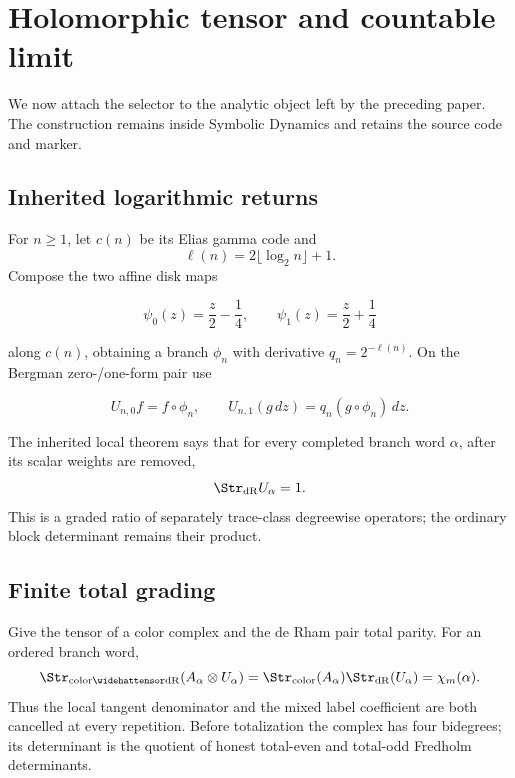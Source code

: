 \section{Holomorphic tensor and countable limit}
\label{sec:analytic}

We now attach the selector to the analytic object left by the preceding
paper.  The construction remains inside Symbolic Dynamics and retains the
source code and marker.

\subsection{Inherited logarithmic returns}

For \(n\ge1\), let \(c(n)\) be its Elias gamma code and
\begin{equation}
 \ell(n)=2\lfloor\log_2n\rfloor+1.
 \label{eq:gamma-length}
\end{equation}
Compose the two affine disk maps

\[
 \psi_0(z)=\frac z2-\frac14,
 \qquad
 \psi_1(z)=\frac z2+\frac14
\]

along \(c(n)\), obtaining a branch \(\phi_n\) with derivative
\(q_n=2^{-\ell(n)}\).  On the Bergman zero-/one-form pair use

\[
 U_{n,0}f=f\circ\phi_n,
 \qquad
 U_{n,1}(g\,dz)=q_n(g\circ\phi_n)\,dz.
\]

The inherited local theorem says that for every completed branch word
\(\alpha\), after its scalar weights are removed,
\begin{equation}
 \Str_{\mathrm{dR}}U_\alpha=1.
 \label{eq:inherited-derham}
\end{equation}
This is a graded ratio of separately trace-class degreewise operators; the
ordinary block determinant remains their product.

\subsection{Finite total grading}

Give the tensor of a color complex and the de Rham pair total parity.  For an
ordered branch word,
\begin{equation}
 \Str_{\mathrm{color}\widehattensor\mathrm{dR}}
 (A_\alpha\otimes U_\alpha)
 =\Str_{\mathrm{color}}(A_\alpha)
  \Str_{\mathrm{dR}}(U_\alpha)
 =\chi_m(\alpha).
 \label{eq:total-supertrace}
\end{equation}
Thus the local tangent denominator and the mixed label coefficient are both
cancelled at every repetition.  Before totalization the complex has four
bidegrees; its determinant is the quotient of honest total-even and total-odd
Fredholm determinants.

